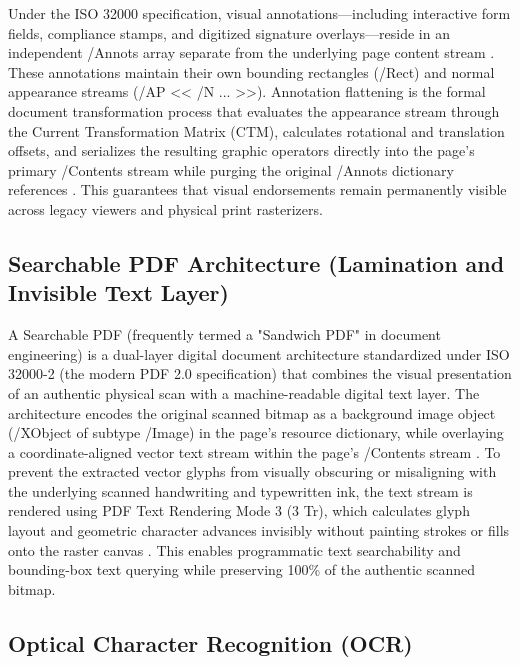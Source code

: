 Under the ISO 32000 specification, visual annotations—including interactive form fields, compliance stamps, and digitized signature overlays—reside in an independent /Annots array separate from the underlying page content stream \cite{ref12}.
These annotations maintain their own bounding rectangles (/Rect) and normal appearance streams (/AP \textless\textless{} /N ... \textgreater\textgreater{}).
Annotation flattening is the formal document transformation process that evaluates the appearance stream through the Current Transformation Matrix (CTM), calculates rotational and translation offsets, and serializes the resulting graphic operators directly into the page's primary /Contents stream while purging the original /Annots dictionary references \cite{ref17}.
This guarantees that visual endorsements remain permanently visible across legacy viewers and physical print rasterizers.

\subsection{Searchable PDF Architecture (Lamination and Invisible Text Layer)}

A Searchable PDF (frequently termed a "Sandwich PDF" in document engineering) is a dual-layer digital document architecture standardized under ISO 32000-2 (the modern PDF 2.0 specification) \cite{ref18} that combines the visual presentation of an authentic physical scan with a machine-readable digital text layer.
The architecture encodes the original scanned bitmap as a background image object (/XObject of subtype /Image) in the page's resource dictionary, while overlaying a coordinate-aligned vector text stream within the page's /Contents stream \cite{ref18, ref19}.
To prevent the extracted vector glyphs from visually obscuring or misaligning with the underlying scanned handwriting and typewritten ink, the text stream is rendered using PDF Text Rendering Mode 3 (3 Tr), which calculates glyph layout and geometric character advances invisibly without painting strokes or fills onto the raster canvas \cite{ref18}.
This enables programmatic text searchability and bounding-box text querying while preserving 100\% of the authentic scanned bitmap.

\subsection{Optical Character Recognition (OCR)}

